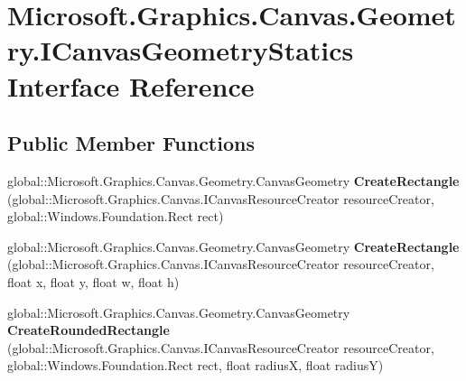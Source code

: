 \hypertarget{interface_microsoft_1_1_graphics_1_1_canvas_1_1_geometry_1_1_i_canvas_geometry_statics}{}\section{Microsoft.\+Graphics.\+Canvas.\+Geometry.\+I\+Canvas\+Geometry\+Statics Interface Reference}
\label{interface_microsoft_1_1_graphics_1_1_canvas_1_1_geometry_1_1_i_canvas_geometry_statics}
\subsection*{Public Member Functions}
\begin{DoxyCompactItemize}
\item 
\mbox{\label{interface_microsoft_1_1_graphics_1_1_canvas_1_1_geometry_1_1_i_canvas_geometry_statics_aff71f79d64e1ba2376363e2e42b22d9c}} 
global\+::\+Microsoft.\+Graphics.\+Canvas.\+Geometry.\+Canvas\+Geometry {\bfseries Create\+Rectangle} (global\+::\+Microsoft.\+Graphics.\+Canvas.\+I\+Canvas\+Resource\+Creator resource\+Creator, global\+::\+Windows.\+Foundation.\+Rect rect)
\item 
\mbox{\label{interface_microsoft_1_1_graphics_1_1_canvas_1_1_geometry_1_1_i_canvas_geometry_statics_ad213020482dda8837e816bbf8beb83b3}} 
global\+::\+Microsoft.\+Graphics.\+Canvas.\+Geometry.\+Canvas\+Geometry {\bfseries Create\+Rectangle} (global\+::\+Microsoft.\+Graphics.\+Canvas.\+I\+Canvas\+Resource\+Creator resource\+Creator, float x, float y, float w, float h)
\item 
\mbox{\label{interface_microsoft_1_1_graphics_1_1_canvas_1_1_geometry_1_1_i_canvas_geometry_statics_acbf2b94143b555578919975d9e78e754}} 
global\+::\+Microsoft.\+Graphics.\+Canvas.\+Geometry.\+Canvas\+Geometry {\bfseries Create\+Rounded\+Rectangle} (global\+::\+Microsoft.\+Graphics.\+Canvas.\+I\+Canvas\+Resource\+Creator resource\+Creator, global\+::\+Windows.\+Foundation.\+Rect rect, float radiusX, float radiusY)
\item 

\end{DoxyCompactItemize}
